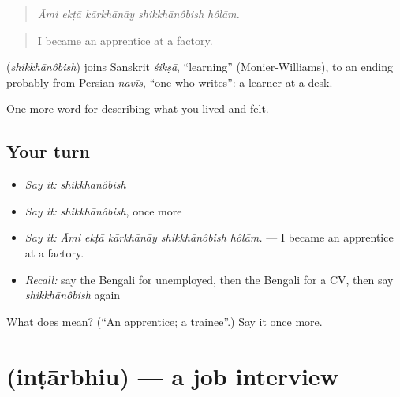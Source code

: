 \begin{quote}
    
\end{quote}

\begin{quote}
\emph{Āmi ekṭā kārkhānāy shikkhānôbish hôlām.}
\end{quote}

\begin{quote}
I became an apprentice at a factory.
\end{quote}

\begin{cousinweb}
\textbf{} (\emph{shikkhānôbish}) joins Sanskrit \emph{śikṣā}, \textquotedblleft{}learning\textquotedblright{} (Monier-Williams), to an ending probably from Persian \emph{navīs}, \textquotedblleft{}one who writes\textquotedblright{}: a learner at a desk.
\end{cousinweb}

\begin{grammarlens}[title={What you've built}]
One more word for describing what you lived and felt.
\end{grammarlens}

\subsection*{Your turn}
\begin{itemize}
\raggedright
  \item \emph{Say it:} \emph{shikkhānôbish}
  \item \emph{Say it:} \emph{shikkhānôbish}, once more
  \item \emph{Say it:} \emph{Āmi ekṭā kārkhānāy shikkhānôbish hôlām.} — I became an apprentice at a factory.
  \item \emph{Recall:} say the Bengali for unemployed, then the Bengali for a CV, then say \emph{shikkhānôbish} again
\end{itemize}

\begin{tcolorbox}[breakable,colback=teal!4,colframe=teal!35!black,title={Before you move on}]
What does  mean? (\textquotedblleft{}An apprentice; a trainee\textquotedblright{}.) Say it once more.
\end{tcolorbox}
\section[\texorpdfstring{\bn{ইন্টারভিউ} (inṭārbhiu)}{ইন্টারভিউ (inṭārbhiu)}]{ (inṭārbhiu) — a job interview}

